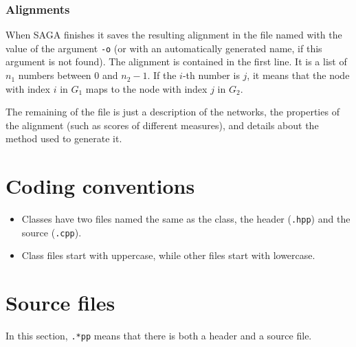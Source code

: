 \documentclass[]{article}
\begin{document}
\subsubsection*{Alignments}
When SAGA finishes it saves the resulting alignment in the file named with the value of the argument \texttt{-o} (or with an automatically generated name, if this argument is not found). The alignment is contained in the first line. It is a list of $n_1$ numbers between $0$ and $n_2-1$. If the $i$-th number is $j$, it means that the node with index $i$ in $G_1$ maps to the node with index $j$ in $G_2$.

The remaining of the file is just a description of the networks, the properties of the alignment (such as scores of different measures), and details about the method used to generate it.

\section{Coding conventions}

\begin{itemize}
\item Classes have two files named the same as the class, the header (\texttt{.hpp}) and the source (\texttt{.cpp}).
\item Class files start with uppercase, while other files start with lowercase.
\end{itemize}


\section{Source files}
In this section, \texttt{.*pp} means that there is both a header and a source file.
\end{document}
